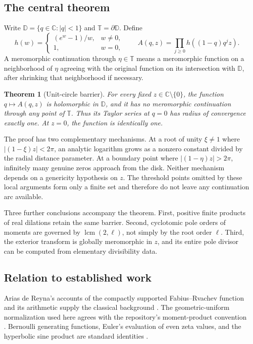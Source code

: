 \documentclass[11pt,a4paper]{article}
\numberwithin{equation}{section}
\newtheorem{theorem}{Theorem}[section]
\theoremstyle{definition}
\theoremstyle{remark}
\newcommand{\C}{\mathbb C}
\newcommand{\D}{\mathbb D}
\newcommand{\T}{\mathbb T}
\newcommand{\lcm}{\operatorname{lcm}}
\begin{document}
\subsection{The central theorem}
Write \(\D=\{q\in\C:|q|<1\}\) and \(\T=\partial\D\). Define
\begin{equation}\label{eq:def-h}
 h(w)=\begin{cases}(e^w-1)/w,&w\ne0,\\1,&w=0,\end{cases}
 \qquad A(q,z)=\prod_{j\ge0}h((1-q)q^jz).
\end{equation}
A meromorphic continuation through \(\eta\in\T\) means a meromorphic function on a neighborhood of \(\eta\) agreeing with the original function on its intersection with \(\D\), after shrinking that neighborhood if necessary.

\begin{theorem}[Unit-circle barrier]\label{thm:main}
For every fixed \(z\in\C\setminus\{0\}\), the function \(q\mapsto A(q,z)\) is holomorphic in \(\D\), and it has no meromorphic continuation through any point of \(\T\). Thus its Taylor series at \(q=0\) has radius of convergence exactly one. At \(z=0\), the function is identically one.
\end{theorem}

The proof has two complementary mechanisms. At a root of unity \(\xi\ne1\) where \(|(1-\xi)z|<2\pi\), an analytic logarithm grows as a nonzero constant divided by the radial distance parameter. At a boundary point where \(|(1-\eta)z|>2\pi\), infinitely many genuine zeros approach from the disk. Neither mechanism depends on a genericity hypothesis on \(z\). The threshold points omitted by these local arguments form only a finite set and therefore do not leave any continuation arc available.

Three further conclusions accompany the theorem. First, positive finite products of real dilations retain the same barrier. Second, cyclotomic pole orders of moments are governed by \(\lcm(2,\ell)\), not simply by the root order \(\ell\). Third, the exterior transform is globally meromorphic in \(z\), and its entire pole divisor can be computed from elementary divisibility data.

\subsection{Relation to established work}
Arias de Reyna's accounts of the compactly supported Fabius--Rvachev function and its arithmetic supply the classical background \cite{arias-definition,arias-arithmetic}. The geometric-uniform normalization used here agrees with the repository's moment-product convention \cite{repo}. Bernoulli generating functions, Euler's evaluation of even zeta values, and the hyperbolic sine product are standard identities \cite{dlmf}.
\end{document}
